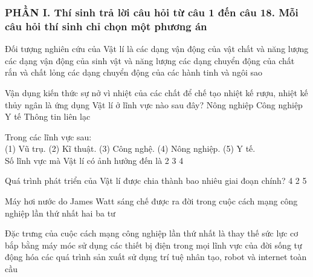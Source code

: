 \subsubsection*{PHẦN I. Thí sinh trả lời câu hỏi từ câu 1 đến câu 18. Mỗi câu hỏi thí sinh chỉ chọn một phương án}
\setcounter{ex}{0}
\begin{ex}%
Đối tượng nghiên cứu của Vật lí là
\choice
{\True các dạng vận động của vật chất và năng lượng}
{các dạng vận động của sinh vật và năng lượng}
{các dạng chuyển động của chất rắn và chất lỏng}
{các dạng chuyển động của các hành tinh và ngôi sao}

\end{ex}




\begin{ex}%
Vận dụng kiến thức sự nở vì nhiệt của các chất để chế tạo nhiệt kế rượu, nhiệt kế thủy ngân là ứng dụng Vật lí ở lĩnh vực nào sau đây?
\choice
{Nông nghiệp}
{Công nghiệp}
{\True Y tế}
{Thông tin liên lạc}

\end{ex}

\begin{ex}%
Trong các lĩnh vực sau:\\
(1) Vũ trụ.\quad
\quad(2) Kĩ thuật.
\quad(3) Công nghệ.
\quad(4) Nông nghiệp. 
\quad(5) Y tế.	\\
Số lĩnh vực mà Vật lí có ảnh hưởng đến là
\choice
{2}
{3}
{4}
{}

\end{ex}


\begin{ex}%
Quá trình phát triển của Vật lí được chia thành bao nhiêu giai đoạn chính?
\choice
{}
{4}
{2}
{5}	
\end{ex}


\begin{ex}%
Máy hơi nước do James Watt sáng chế được ra đời trong cuộc cách mạng công nghiệp lần thứ
\choice
{\True nhất}
{hai}
{ba}
{tư}
\end{ex}

\begin{ex}%
Đặc trưng của cuộc cách mạng công nghiệp lần thứ nhất là
\choice
{\True thay thế sức lực cơ bắp bằng máy móc}
{sử dụng các thiết bị điện trong mọi lĩnh vực của đời sống}
{tự động hóa các quá trình sản xuất}
{sử dụng trí tuệ nhân tạo, robot và internet toàn cầu}

\end{ex}

